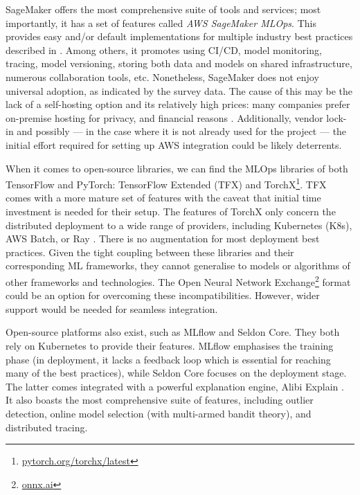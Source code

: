 SageMaker offers the most comprehensive suite of tools and services; most importantly, it has a set of features called \textit{AWS SageMaker MLOps}. This provides easy and/or default implementations for multiple industry best practices described in \cite{serban2020adoption,serban2021practices,john2020ai}. Among others, it promotes using CI/CD, model monitoring, tracing, model versioning, storing both data and models on shared infrastructure, numerous collaboration tools, etc. Nonetheless, SageMaker does not enjoy universal adoption, as indicated by the survey data. The cause of this may be the lack of a self-hosting option and its relatively high prices: many companies prefer on-premise hosting for privacy, and financial reasons \cite{bosch2021engineering}. Additionally, vendor lock-in and possibly --- in the case where it is not already used for the project --- the initial effort required for setting up AWS integration could be likely deterrents.

When it comes to open-source libraries, we can find the MLOps libraries of both TensorFlow and PyTorch: TensorFlow Extended (TFX) \cite{baylor2017tfx} and TorchX\footnote{\href{https://pytorch.org/torchx/latest/}{pytorch.org/torchx/latest}}. TFX comes with a more mature set of features with the caveat that initial time investment is needed for their setup. The features of TorchX only concern the distributed deployment to a wide range of providers, including Kubernetes (K8s), AWS Batch, or Ray \cite{moritz2018ray}. There is no augmentation for most deployment best practices. Given the tight coupling between these libraries and their corresponding ML frameworks, they cannot generalise to models or algorithms of other frameworks and technologies. The Open Neural Network Exchange\footnote{\href{https://onnx.ai/}{onnx.ai}} format could be an option for overcoming these incompatibilities. However, wider support would be needed for seamless integration.

Open-source platforms also exist, such as MLflow and Seldon Core. They both rely on Kubernetes to provide their features. MLflow emphasises the training phase (in deployment, it lacks a feedback loop which is essential for reaching many of the best practices), while Seldon Core focuses on the deployment stage. The latter comes integrated with a powerful explanation engine, Alibi Explain \cite{klaise2021alibi}. It also boasts the most comprehensive suite of features, including outlier detection, online model selection (with multi-armed bandit theory), and distributed tracing. 


